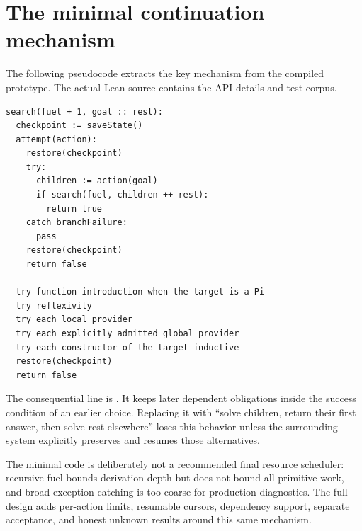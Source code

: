 \section{The minimal continuation mechanism}
\label{app:core}
The following pseudocode extracts the key mechanism from the compiled prototype. The actual Lean source contains the API details and test corpus.
\begin{lstlisting}
search(fuel + 1, goal :: rest):
  checkpoint := saveState()
  attempt(action):
    restore(checkpoint)
    try:
      children := action(goal)
      if search(fuel, children ++ rest):
        return true
    catch branchFailure:
      pass
    restore(checkpoint)
    return false

  try function introduction when the target is a Pi
  try reflexivity
  try each local provider
  try each explicitly admitted global provider
  try each constructor of the target inductive
  restore(checkpoint)
  return false
\end{lstlisting}
The consequential line is . It keeps later dependent obligations inside the success condition of an earlier choice. Replacing it with ``solve children, return their first answer, then solve rest elsewhere'' loses this behavior unless the surrounding system explicitly preserves and resumes those alternatives.

The minimal code is deliberately not a recommended final resource scheduler: recursive fuel bounds derivation depth but does not bound all primitive work, and broad exception catching is too coarse for production diagnostics. The full design adds per-action limits, resumable cursors, dependency support, separate acceptance, and honest unknown results around this same mechanism.
